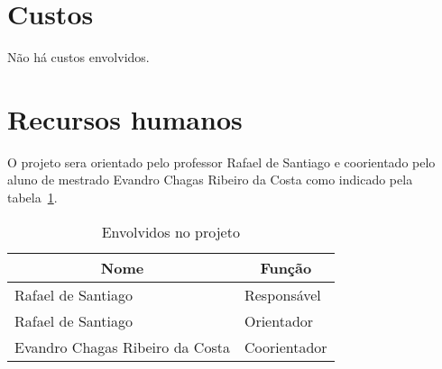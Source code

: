 \documentclass[
  12pt,
  openright,
  twoside,
  a4paper,
  english,
  brazil
]{abntex2}
\begin{document}
\begin{table}[h]
  \caption{Planejamento das etapas do trabalho de conclusão de curso}\label{tab:cronograma}
\end{table}

\section{Custos}\label{cap:custos}

Não há custos envolvidos.

\section{Recursos humanos}\label{cap:recursos_humanos}

O projeto sera orientado pelo professor Rafael de Santiago e coorientado pelo aluno de mestrado Evandro Chagas Ribeiro da Costa como indicado pela tabela~\ref{tab:envolvidos}.

\begin{table}[h]
  \caption{Envolvidos no projeto}\label{tab:envolvidos}
    \centering
      \begin{tabular}{@{}ll@{}}
        \toprule
        \multicolumn{1}{c}{Nome} & \multicolumn{1}{c}{Função} \\
        \midrule
        Rafael de Santiago & Responsável \\
        Rafael de Santiago & Orientador \\
        Evandro Chagas Ribeiro da Costa & Coorientador \\
        \bottomrule
      \end{tabular}
\end{table}
\end{document}
